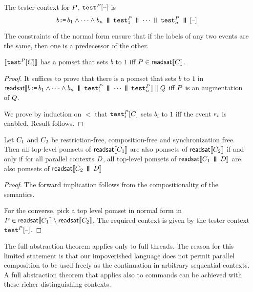 \begin{definition}\label{testAPS} 
The tester context for $P$, $\testP{\aPS}{}\hole{}$ is 
\[
b \GETS b_{1} \land  \cdots \land b_{n}
\PAR  \testP{\aPS}{1} 
\PAR   \cdots 
\PAR  \testP{\aPS}{n} 
\PAR \hole{}
\]
\end{definition}
The constraints of the normal form ensure that if the labels of any two events are the same, then one is a predecessor of the other. 

\begin{lemma}\label{tester}
$\sem{\testP{\aPS}{}\hole{\aCmd}}$  has a pomset that sets $b$ to $1$ iff $P \in \mathsf{readsat}\llbracket C\rrbracket$.
\begin{proof}
It suffices to prove that there is a pomset that sets $b$ to $1$ in
 $\mathsf{readsat}\llbracket b \texttt{:}\mkern-1mu\texttt{=}\, b_{1} \land  \cdots \land b_{n}
\,\mathbin{\texttt{\textbf{|}}\mkern-6mu\texttt{\textbf{|}}}\,  {\tt test}^{P}_{1} 
\,\mathbin{\texttt{\textbf{|}}\mkern-6mu\texttt{\textbf{|}}}\,   \cdots 
\,\mathbin{\texttt{\textbf{|}}\mkern-6mu\texttt{\textbf{|}}}\,  {\tt test}^{P}_{n}\rrbracket \parallel Q$ iff $P$ is an augmentation of $Q$. 

We prove by induction on $\lt$ that $\testP{\aPS}{i}\hole{\aCmd}$  sets $b_i$ to $1$ iff the event $e_i$ is enabled. Result follows.
\end{proof}
\end{lemma}

\begin{theorem}
  Let $C_1$ and $C_2$ be restriction-free, composition-free and
  synchronization free.  Then all top-level pomsets of
  $\mathsf{readsat}\llbracket C_1\rrbracket$ are also pomsets of $\mathsf{readsat}\llbracket C_2\rrbracket$ if
  and only if for all parallel contexts $D$, all top-level pomsets of
  $\mathsf{readsat}\llbracket C_1 \,\mathbin{\texttt{\textbf{|}}\mkern-6mu\texttt{\textbf{|}}}\, D\rrbracket$ are also pomsets of
  $\mathsf{readsat}\llbracket C_2 \,\mathbin{\texttt{\textbf{|}}\mkern-6mu\texttt{\textbf{|}}}\, D\rrbracket$
\begin{proof}
  The forward implication follows from the compositionality of the semantics.

  For the converse, pick a top level pomset in normal form in
  $P \in \mathsf{readsat}\llbracket C_1\rrbracket \setminus \mathsf{readsat}\llbracket C_2\rrbracket $.  The
  required context is given by the tester context $\testP{\aPS}{}\hole{}$.
 \end{proof}
\end{theorem}

The full abstraction theorem applies only to full threads.  The reason for this limited statement is that our impoverished language does not permit  parallel composition to be used freely as the continuation in arbitrary sequential contexts.  A full abstraction theorem that applies also to commands can be achieved with these richer distinguishing contexts.  
